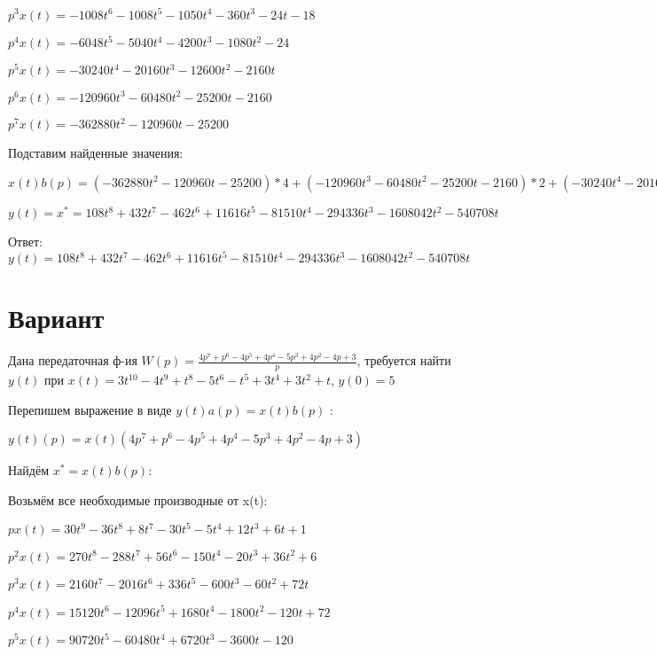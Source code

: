 \documentclass{article}
\begin{document}
{{{{{$p^3x(t)=-1008t^{6}-1008t^{5}-1050t^{4}-360t^{3}-24t-18$

$p^4x(t)=-6048t^{5}-5040t^{4}-4200t^{3}-1080t^{2}-24$

$p^5x(t)=-30240t^{4}-20160t^{3}-12600t^{2}-2160t$

$p^6x(t)=-120960t^{3}-60480t^{2}-25200t-2160$

$p^7x(t)=-362880t^{2}-120960t-25200$

Подставим найденные значения:

$x(t)b(p) = (-362880t^{2}-120960t-25200)*4+(-120960t^{3}-60480t^{2}-25200t-2160)*2+(-30240t^{4}-20160t^{3}-12600t^{2}-2160t)*3+(-6048t^{5}-5040t^{4}-4200t^{3}-1080t^{2}-24)*(-2)+(-1008t^{6}-1008t^{5}-1050t^{4}-360t^{3}-24t-18)*1+(-144t^{7}-168t^{6}-210t^{5}-90t^{4}-12t^{2}-18t)*(-2)+(-18t^{8}-24t^{7}-35t^{6}-18t^{5}-4t^{3}-9t^{2}-1)*(-3)+(-18t^{8}-24t^{7}-35t^{6}-18t^{5}-4t^{3}-9t^{2}-1)*(-3)=108t^{8}+432t^{7}-462t^{6}+11616t^{5}-81510t^{4}-294336t^{3}-1608042t^{2}-540708t$





$y(t)=x^*=108t^{8}+432t^{7}-462t^{6}+11616t^{5}-81510t^{4}-294336t^{3}-1608042t^{2}-540708t$

Ответ: $y(t) = 108t^{8}+432t^{7}-462t^{6}+11616t^{5}-81510t^{4}-294336t^{3}-1608042t^{2}-540708t$

\section{Вариант}

Дана передаточная ф-ия $W(p)=\frac{4p^{7}+p^{6}-4p^{5}+4p^{4}-5p^{3}+4p^{2}-4p+3}{p}$, требуется найти $y(t)$ при $x(t)=3t^{10}-4t^{9}+t^{8}-5t^{6}-t^{5}+3t^{4}+3t^{2}+t$, $y(0)=5$

Перепишем выражение в виде $y(t)a(p)=x(t)b(p)$ :

$y(t)(p)=x(t)(4p^{7}+p^{6}-4p^{5}+4p^{4}-5p^{3}+4p^{2}-4p+3)$

Найдём $x^*=x(t)b(p)$:

Возьмём все необходимые производные от x(t):

$px(t)=30t^{9}-36t^{8}+8t^{7}-30t^{5}-5t^{4}+12t^{3}+6t+1$

$p^2x(t)=270t^{8}-288t^{7}+56t^{6}-150t^{4}-20t^{3}+36t^{2}+6$

$p^3x(t)=2160t^{7}-2016t^{6}+336t^{5}-600t^{3}-60t^{2}+72t$

$p^4x(t)=15120t^{6}-12096t^{5}+1680t^{4}-1800t^{2}-120t+72$

$p^5x(t)=90720t^{5}-60480t^{4}+6720t^{3}-3600t-120$

}}}}}
\end{document}
